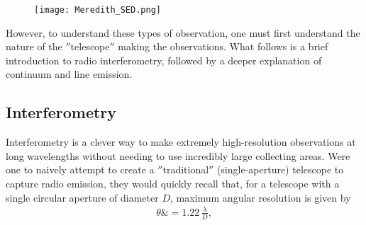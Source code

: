 \begin{figure}
\centering
  \texttt{[image: Meredith\_SED.png]}
  \label{fig:SED}
\end{figure}


However, to understand these types of observation, one must first understand the nature of the $''$telescope$''$ making the observations. What follows is a brief introduction to radio interferometry, followed by a deeper explanation of continuum and line emission.



\subsection{Interferometry}
\label{section:interferometry}
Interferometry is a clever way to make extremely high-resolution observations at long wavelengths without needing to use incredibly large collecting areas. Were one to naively attempt to create a $''$traditional$''$ (single-aperture) telescope to capture radio emission, they would quickly recall that, for a telescope with a single circular aperture of diameter $D$, maximum angular resolution is given by
\begin{align}
  \theta \&= 1.22 \, \frac{\lambda}{D},
\end{align}

